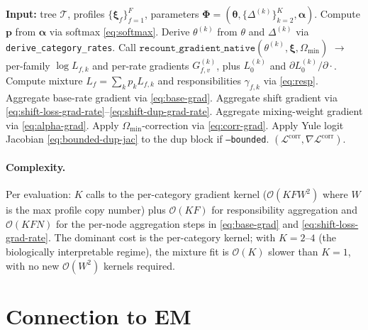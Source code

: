 \documentclass[11pt]{article}
\newcommand{\Tree}{\mathcal{T}}
\newcommand{\Prof}{\boldsymbol{\xi}}
\newcommand{\Ll}{\mathcal{L}}
\newcommand{\Om}{\Omega}
\theoremstyle{definition}
\begin{document}
\begin{algorithm}
\caption{Mixture corrected-LL and gradient}
\label{alg:mix}
\begin{algorithmic}[1]
\State \textbf{Input:} tree $\Tree$, profiles $\{\Prof_f\}_{f=1}^F$,
        parameters $\bm\Phi = (\bm\theta, \{\Delta^{(k)}\}_{k=2}^K, \bm\alpha)$.
\State Compute $\bm p$ from $\bm\alpha$ via softmax \eqref{eq:softmax}.
  \State Derive $\theta^{(k)}$ from $\theta$ and $\Delta^{(k)}$
         via \texttt{derive\_category\_rates}.
  \State Call $\texttt{recount\_gradient\_native}(\theta^{(k)}, \Prof, \Om_{\min})$
         $\to$ per-family $\log L_{f,k}$ and per-rate gradients
         $G^{(k)}_{f,v}$, plus $L_0^{(k)}$ and
         $\partial L_0^{(k)}/\partial\cdot$.
\EndFor
\State Compute mixture $L_f = \sum_k p_k L_{f,k}$ and responsibilities
        $\gamma_{f,k}$ via \eqref{eq:resp}.
\State Aggregate base-rate gradient via \eqref{eq:base-grad}.
\State Aggregate shift gradient via
        \eqref{eq:shift-loss-grad-rate}--\eqref{eq:shift-dup-grad-rate}.
\State Aggregate mixing-weight gradient via \eqref{eq:alpha-grad}.
\State Apply $\Om_{\min}$-correction via \eqref{eq:corr-grad}.
\State Apply Yule logit Jacobian \eqref{eq:bounded-dup-jac}
       to the dup block if \texttt{--bounded}.
\State \Return $(\Ll^{\mathrm{corr}}, \nabla\Ll^{\mathrm{corr}})$.
\end{algorithmic}
\end{algorithm}

\paragraph{Complexity.} Per evaluation: $K$ calls to the per-category
gradient kernel ($\mathcal{O}(KFW^2)$ where $W$ is the max profile
copy number) plus $\mathcal{O}(KF)$ for responsibility aggregation
and $\mathcal{O}(KFN)$ for the per-node aggregation steps in
\eqref{eq:base-grad} and \eqref{eq:shift-loss-grad-rate}. The
dominant cost is the per-category kernel; with $K=2$--$4$ (the
biologically interpretable regime), the mixture fit is
$\mathcal{O}(K)$ slower than $K=1$, with no new $\mathcal{O}(W^2)$
kernels required.

\section{Connection to EM}
\label{sec:em}
\end{document}
